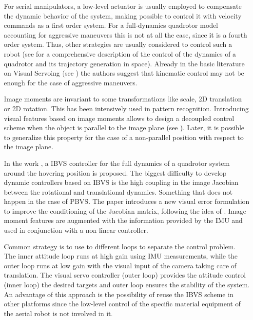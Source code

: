 For serial manipulators, a low-level actuator is usually employed to compensate the dynamic behavior of the system, making possible to control it with velocity commands as a first order system. For a full-dynamics quadrotor model accounting for aggressive maneuvers this is not at all the case, since it is a fourth order system. Thus, other strategies are usually considered to control such a robot (see \cite{Mellinger} for a comprehensive description of the control of the dynamics of a quadrotor and its trajectory generation in space). Already in the basic literature on Visual Servoing (see \cite{chaumette_visual_2007}) the authors suggest that kinematic control may not be enough for the case of aggressive maneuvers. 

Image moments are invariant to some transformations like scale, 2D translation or 2D rotation. This has been intensively used in pattern recognition. Introducing visual features based on image moments allows to design a decoupled control scheme when the object is parallel to the image plane (see \cite{tahri_2005}). Later, it is possible to generalize this property for the case of a non-parallel position with respect to the image plane.


In the work \cite{guenard_2008}, a IBVS controller for the full dynamics of a quadrotor system around the hovering position is proposed. The biggest difficulty to develop dynamic controllers based on IBVS is the high coupling in the image Jacobian between the rotational and translational dynamics. Something that does not happen in the case of PBVS. The paper introduces a new visual error formulation to improve the conditioning of the Jacobian matrix, following the idea of \cite{hamel_2002}. Image moment features are augmented with the information provided by the IMU and used in conjunction with a non-linear controller.


Common strategy is to use to different loops to separate the control problem. The inner attitude loop runs at high gain using IMU measurements, while the outer loop runs at low gain with the visual input of the camera taking care of translation. The visual servo controller (outer loop) provides the attitude control (inner loop) the desired targets and outer loop ensures the stability of the system. An advantage of this approach is the possibility of reuse the IBVS scheme in other platforms since the low-level control of the specific material equipment of the aerial robot is not involved in it.

